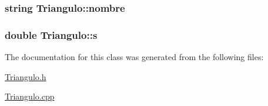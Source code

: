 \hypertarget{class_triangulo_a92bbfa4ca7bc38489e7bddd797a84cbf}{
\subsubsection[{nombre}]{\setlength{\rightskip}{0pt plus 5cm}string Triangulo\+::nombre}}\label{class_triangulo_a92bbfa4ca7bc38489e7bddd797a84cbf}
\hypertarget{class_triangulo_a3a4640a5567d24a3df3c9f0462844ad8}{
\subsubsection[{s}]{\setlength{\rightskip}{0pt plus 5cm}double Triangulo\+::s}}\label{class_triangulo_a3a4640a5567d24a3df3c9f0462844ad8}


The documentation for this class was generated from the following files\+:\begin{DoxyCompactItemize}
\item 
\hyperlink{_triangulo_8h}{Triangulo.\+h}\item 
\hyperlink{_triangulo_8cpp}{Triangulo.\+cpp}\end{DoxyCompactItemize}
